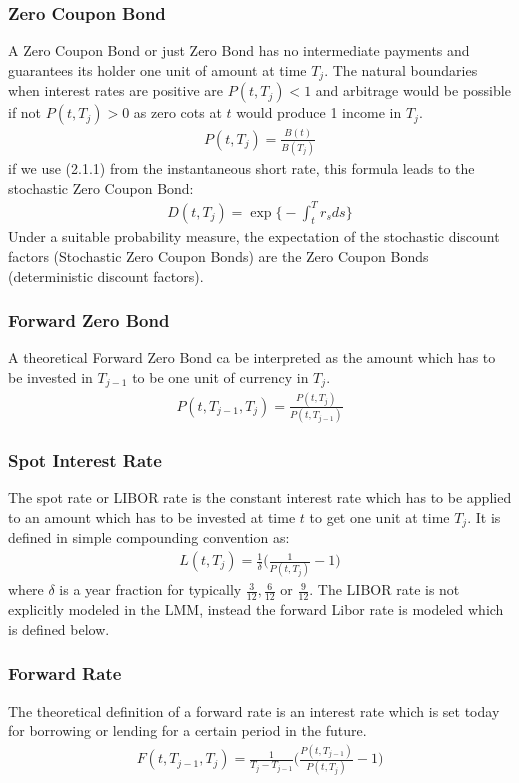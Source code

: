\documentclass[11pt]{article}
\numberwithin{equation}{subsection}
\begin{document}
\subsubsection{Zero Coupon Bond}
A Zero Coupon Bond or just Zero Bond has no intermediate payments and guarantees its holder one unit of amount at time \(T_j\). The natural boundaries when interest rates are positive are \(P(t, T_j)<1\) and arbitrage would be possible if not \(P(t, T_j)>0\) as zero cots at \(t\) would produce 1 income in \(T_j\).
\begin{eqnarray}
	P(t, T_j) =  \frac{B(t)}{B(T_j)}
\end{eqnarray}	
if we use (2.1.1) from the instantaneous short rate, this formula leads to the stochastic Zero Coupon Bond:
\begin{eqnarray}
D(t, T_j) = \exp\bigg\{-\int_{t}^{T}r_s ds\bigg\}
\end{eqnarray}	
Under a suitable probability measure, the expectation of the stochastic discount factors (Stochastic Zero Coupon Bonds) are the Zero Coupon Bonds (deterministic discount factors).
\subsubsection{Forward Zero Bond}
A theoretical Forward Zero Bond ca be interpreted as the amount which has to be invested in \(T_{j-1}\) to be one unit of currency in \(T_{j}\).
\begin{eqnarray}
	P(t, T_{j-1}, T_j) = \frac{P(t, T_j)}{P(t, T_{j-1})}
\end{eqnarray}	
\subsubsection{Spot Interest Rate}
The spot rate or LIBOR rate is the constant interest rate which has to be applied to an amount which has to be invested at time \(t\) to get one unit at time \(T_j\). It is defined in simple compounding convention as:
\begin{eqnarray}
L(t, T_j) = \frac{1}{\delta}\bigg(\frac{1}{P(t, T_j)}-1\bigg)
\end{eqnarray}	
where \(\delta\) is a year fraction for typically \(\frac{3}{12}, \frac{6}{12}\) or \(\frac{9}{12}\). The LIBOR rate is not explicitly modeled in the LMM, instead the forward Libor rate is modeled which is defined below. 
\subsubsection{Forward Rate}
The theoretical definition of a forward rate is an interest rate which is set today for borrowing or lending for a certain period in the future.
\begin{eqnarray}
	F(t, T_{j-1}, T_j) = \frac{1}{T_j-T_{j-1}}\bigg(\frac{P(t, T_{j-1})}{P(t, T_j)}-1\bigg)
\end{eqnarray}
\end{document}
